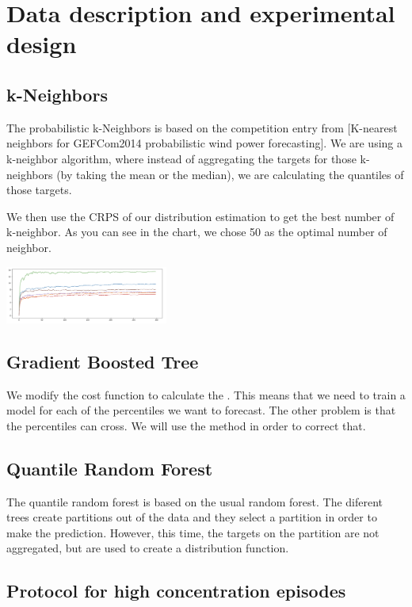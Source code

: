 \documentclass[a4paper,twocolumn,5p]{elsarticle}
\begin{document}
\section{Data description and experimental design}

\subsection{k-Neighbors}


The probabilistic k-Neighbors is based on the competition entry from [K-nearest neighbors for GEFCom2014 probabilistic wind power forecasting]. We are using a k-neighbor algorithm, where instead of aggregating the targets for those k-neighbors (by taking the mean or the median), we are calculating the quantiles of those targets.

We then use the CRPS of our distribution estimation to get the best number of k-neighbor. As you can see in the chart, we chose 50 as the optimal number of neighbor.

\includegraphics[width=0.4\textwidth]{kneighbor_crps}

\subsection{Gradient Boosted Tree}

We modify the cost function to calculate the . This means that we need to train a model for each of the percentiles we want to
forecast. The other problem is that the percentiles can cross. We will use the method in order to correct that.

\subsection{Quantile Random Forest}

The quantile random forest is based on the usual random forest. The diferent trees create partitions out of the data and 
they select a partition in order to make the prediction. However, this time, the targets on the partition are not aggregated,
but are used to create a distribution function.


\label{sec:mm}

\subsection{Protocol for high \no concentration episodes}
\label{sec:madr-prot-high}
\end{document}
